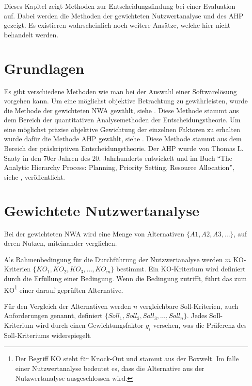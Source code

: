   Dieses Kapitel zeigt Methoden zur Entscheidungsfindung bei einer Evaluation
  auf. Dabei werden die Methoden der gewichteten Nutzwertanalyse und des
  \ac{AHP} gezeigt. Es existieren wahrscheinlich noch weitere Ansätze, welche
  hier nicht behandelt werden.
  
  \section{Grundlagen}
  
  Es gibt verschiedene Methoden wie man bei der Auswahl einer Softwarelösung
  vorgehen kann. Um eine möglichst objektive Betrachtung zu gewährleisten, wurde
  die Methode der gewichteten \ac{NWA} gewählt, siehe \cite{Nutzwertanalyse}.
  Diese Methode stammt aus dem Bereich der quantitativen Analysemethoden der
  Entscheidungstheorie. Um eine möglichst präzise objektive Gewichtung der
  einzelnen Faktoren zu erhalten wurde dafür die Methode \ac{AHP} gewählt,
  siehe \cite{AnalyticHierarchyProcess}. Diese Methode stammt aus dem Bereich
  der präskriptiven Entscheidungstheorie. Der \ac{AHP} wurde von Thomas L.
  Saaty in den 70er Jahren des 20. Jahrhunderts entwickelt und im Buch ``The
  Analytic Hierarchy Process: Planning, Priority Setting, Resource
  Allocation'', siehe \cite{AnalyticHierarchyProcessBook}, veröffentlicht.
  
  \section{Gewichtete Nutzwertanalyse}
  
  Bei der gewichteten \ac{NWA} wird eine Menge von Alternativen \(\{A1, A2,
  A3, \ldots\}\), auf deren Nutzen, miteinander verglichen.
  
  Als Rahmenbedingung für die Durchführung der Nutzwertanalyse werden \(m\)
  KO-Kriterien \(\{KO_1, KO_2, KO_3, \ldots, KO_m\}\) bestimmt. Ein
  KO-Kriterium wird definiert durch die Erfüllung einer Bedingung. Wenn die Bedingung
  zutrifft, führt das zum KO\footnote{Der Begriff KO steht für Knock-Out und
  stammt aus der Boxwelt. Im falle einer Nutzwertanalyse bedeutet es, dass die
  Alternative aus der Nutzwertanalyse ausgeschlossen wird.} einer darauf
  geprüften Alternative.
  
  Für den Vergleich der Alternativen werden \(n\) vergleichbare
  Soll-Kriterien, auch Anforderungen genannt, definiert \(\{Soll_1, Soll_2,
  Soll_3, \ldots, Soll_n\}\). Jedes Soll-Kriterium wird durch einen
  Gewichtungsfaktor \(g_i\) versehen, was die Präferenz des Soll-Kriteriums
  widerspiegelt. 

